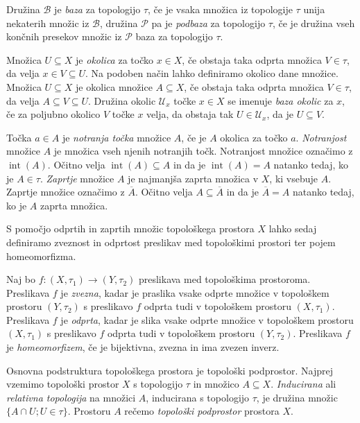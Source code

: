 \documentclass[mat1]{fmfdelo}
\newcommand{\Ucurl}{\mathcal{U}}
\newcommand{\closure}[1]{\overline{#1}}
\DeclareMathOperator{\interior}{int}
\begin{document}
Družina $\mathcal{B}$ je \emph{baza} za topologijo $\tau$, če je vsaka množica iz topologije $\tau$ unija nekaterih množic iz $\mathcal{B}$, družina $\mathcal{P}$ pa je \emph{podbaza} za topologijo $\tau$, če je družina vseh končnih presekov množic iz $\mathcal{P}$ baza za topologijo $\tau$.

Množica $U \subseteq X$ je \emph{okolica} za točko $x \in X$, če obstaja taka odprta množica $V \in \tau$, da velja $x \in V \subseteq U$. Na podoben način lahko definiramo okolico dane množice.
Množica $U \subseteq X$ je okolica množice $A \subseteq X$, če obstaja taka odprta množica $V \in \tau$, da velja $A \subseteq V \subseteq U$.
Družina okolic $\Ucurl_x$ točke $x \in X$ se imenuje \emph{baza okolic} za $x$, če za poljubno okolico $V$ točke $x$ velja, da obstaja tak $U \in \Ucurl_x$, da je $U \subseteq V$.

Točka $a \in A$ je \emph{notranja točka} množice $A$, če je $A$ okolica za točko $a$.
\emph{Notranjost} množice $A$ je množica vseh njenih notranjih točk. Notranjost množice označimo z $\interior(A)$. Očitno velja $\interior(A) \subseteq A$ in da je $\interior(A) = A$ natanko tedaj, ko je $A \in \tau$.
\emph{Zaprtje} množice $A$ je najmanjša zaprta množica v $X$, ki vsebuje $A$. Zaprtje množice označimo z $\closure{A}$. Očitno velja $A \subseteq \closure{A}$ in da je $\closure{A} = A$ natanko tedaj, ko je $A$ zaprta množica.

S pomočjo odprtih in zaprtih množic topološkega prostora $X$ lahko sedaj de\-fi\-ni\-ra\-mo zveznost in odprtost preslikav med topološkimi prostori ter pojem ho\-me\-o\-mor\-fiz\-ma.

Naj bo $f\colon (X, \tau_1) \to (Y, \tau_2)$ preslikava med topološkima prostoroma.
Preslikava $f$ je \emph{zvezna}, kadar je praslika vsake odprte množice v topološkem prostoru $(Y, \tau_2)$ s preslikavo $f$ odprta tudi v topološkem prostoru $(X, \tau_1)$.
Preslikava $f$ je \emph{odprta}, kadar je slika vsake odprte množice v topološkem prostoru $(X, \tau_1)$ s preslikavo $f$ odprta tudi v topološkem prostoru $(Y, \tau_2)$.
Preslikava $f$ je \emph{homeomorfizem}, če je bijektivna, zvezna in ima zvezen inverz.

Osnovna podstruktura topološkega prostora je topološki podprostor.
Najprej vzemimo topološki prostor $X$ s topologijo $\tau$ in množico $A \subseteq X$. \emph{Inducirana} ali \emph{relativna topologija} na množici $A$, inducirana s topologijo $\tau$, je družina množic $\lbrace A \cap U ; U \in \tau \rbrace$. Prostoru $A$ rečemo \emph{topološki podprostor} prostora $X$.
\end{document}
